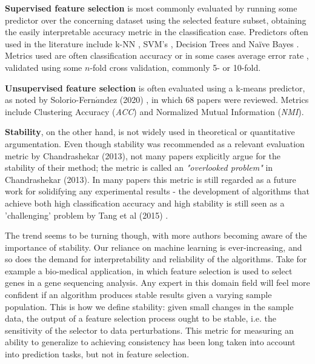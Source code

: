 \documentclass{article}
\begin{document}
\textbf{Supervised feature selection} is most commonly evaluated by running some predictor over the concerning dataset using the selected feature subset, obtaining the easily interpretable accuracy metric in the classification case. Predictors often used in the literature include k-NN \citep{al2020review} \citep{mafarja2020dragonfly}, SVM's \citep{chandrashekar2014survey}, Decision Trees \citep{li2017feature} and Naïve Bayes \citep{koller1996toward}. Metrics used are often classification accuracy or in some cases average error rate \citep{khurma2020evolopy}, validated using some $n$-fold cross validation, commonly 5- or 10-fold.

\textbf{Unsupervised feature selection} is often evaluated using a k-means predictor, as noted by Solorio-Fern$\acute{a}$ndez (2020) \citep{solorio2020review}, in which 68 papers were reviewed. Metrics include Clustering Accuracy (\textit{ACC}) and Normalized Mutual Information (\textit{NMI}). 

\textbf{Stability}, on the other hand, is not widely used in theoretical or quantitative argumentation. Even though stability was recommended as a relevant evaluation metric by Chandrashekar (2013), not many papers explicitly argue for the stability of their method; the metric is called an \textit{"overlooked problem"} in Chandrashekar (2013). In many papers this metric is still regarded as a future work for solidifying any experimental results - the development of algorithms that achieve both high classification accuracy and high stability is still seen as a 'challenging' problem by Tang et al (2015) \citep{tang2014feature}.

The trend seems to be turning though, with more authors becoming aware of the importance of stability. Our reliance on machine learning is ever-increasing, and so does the demand for interpretability and reliability of the algorithms. Take for example a bio-medical application, in which feature selection is used to select genes in a gene sequencing analysis. Any expert in this domain field will feel more confident if an algorithm produces stable results given a varying sample population. This is how we define stability: given small changes in the sample data, the output of a feature selection process ought to be stable, i.e. the sensitivity of the selector to data perturbations. This metric for measuring an ability to generalize to achieving consistency has been long taken into account into prediction tasks, but not in feature selection.
\end{document}
